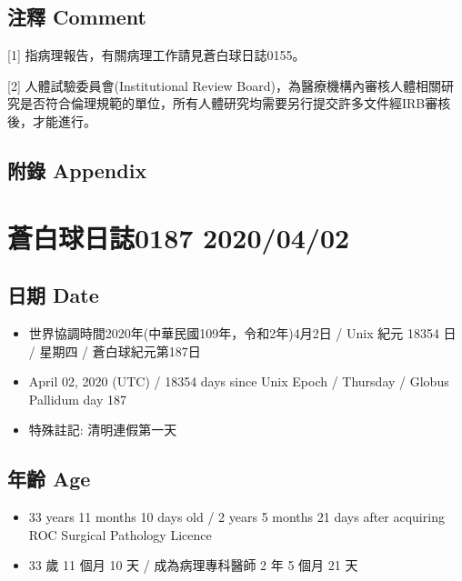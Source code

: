 \documentclass[
]{article}
\providecommand{\tightlist}{%
  \setlength{\itemsep}{0pt}\setlength{\parskip}{0pt}}
\begin{document}
\hypertarget{ux6ce8ux91cb-comment}{%
\subsection{注釋 Comment}\label{ux6ce8ux91cb-comment}}

{[}1{]} 指病理報告，有關病理工作請見蒼白球日誌0155。

{[}2{]} 人體試驗委員會(Institutional Review
Board)，為醫療機構內審核人體相關研究是否符合倫理規範的單位，所有人體研究均需要另行提交許多文件經IRB審核後，才能進行。

\hypertarget{ux9644ux9304-appendix}{%
\subsection{附錄 Appendix}\label{ux9644ux9304-appendix}}

\hypertarget{ux84bcux767dux7403ux65e5ux8a8c0187-20200402}{%
\section{蒼白球日誌0187
2020/04/02}\label{ux84bcux767dux7403ux65e5ux8a8c0187-20200402}}

\hypertarget{ux65e5ux671f-date-1}{%
\subsection{日期 Date}\label{ux65e5ux671f-date-1}}

\begin{itemize}
\tightlist
\item
  世界協調時間2020年(中華民國109年，令和2年)4月2日 / Unix 紀元 18354 日
  / 星期四 / 蒼白球紀元第187日
\item
  April 02, 2020 (UTC) / 18354 days since Unix Epoch / Thursday / Globus
  Pallidum day 187
\item
  特殊註記: 清明連假第一天
\end{itemize}

\hypertarget{ux5e74ux9f61-age-1}{%
\subsection{年齡 Age}\label{ux5e74ux9f61-age-1}}

\begin{itemize}
\tightlist
\item
  33 years 11 months 10 days old / 2 years 5 months 21 days after
  acquiring ROC Surgical Pathology Licence
\item
  33 歲 11 個月 10 天 / 成為病理專科醫師 2 年 5 個月 21 天
\end{itemize}
\end{document}
